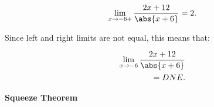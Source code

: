 \documentclass{report}
\begin{document}
        \begin{align*}
            \lim\limits_{x \to -6+}{\frac{2x+12}{\abs{x+6}}} = 2
        .\end{align*}        

        \bigbreak \noindent 
        Since left and right limits are not equal, this means that:

        \begin{align*}
            \lim\limits_{x \to -6}{\frac{2x+12}{\abs{x+6}}} \\ 
            = DNE
        .\end{align*}
        
        \pagebreak
        \begin{Large}
            \noindent \textbf{Squeeze Theorem}
        \end{Large}
        
\end{document}
